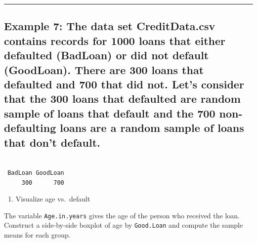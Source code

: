 \documentclass[
]{book}
\newenvironment{Shaded}{\begin{snugshade}}{\end{snugshade}}
\newcommand{\FunctionTok}[1]{\textcolor[rgb]{0.00,0.00,0.00}{#1}}
\newcommand{\NormalTok}[1]{#1}
\newcommand{\OtherTok}[1]{\textcolor[rgb]{0.56,0.35,0.01}{#1}}
\newcommand{\SpecialCharTok}[1]{\textcolor[rgb]{0.00,0.00,0.00}{#1}}
\newcommand{\StringTok}[1]{\textcolor[rgb]{0.31,0.60,0.02}{#1}}
\providecommand{\tightlist}{%
  \setlength{\itemsep}{0pt}\setlength{\parskip}{0pt}}
\begin{document}
\begin{center}\rule{0.5\linewidth}{0.5pt}\end{center}

\hypertarget{example-7-the-data-set-creditdata.csv-contains-records-for-1000-loans-that-either-defaulted-badloan-or-did-not-default-goodloan.-there-are-300-loans-that-defaulted-and-700-that-did-not.-lets-consider-that-the-300-loans-that-defaulted-are-random-sample-of-loans-that-default-and-the-700-non-defaulting-loans-are-a-random-sample-of-loans-that-dont-default.}{%
\subsection{Example 7: The data set CreditData.csv contains records for 1000 loans that either defaulted (BadLoan) or did not default (GoodLoan). There are 300 loans that defaulted and 700 that did not. Let's consider that the 300 loans that defaulted are random sample of loans that default and the 700 non-defaulting loans are a random sample of loans that don't default.}\label{example-7-the-data-set-creditdata.csv-contains-records-for-1000-loans-that-either-defaulted-badloan-or-did-not-default-goodloan.-there-are-300-loans-that-defaulted-and-700-that-did-not.-lets-consider-that-the-300-loans-that-defaulted-are-random-sample-of-loans-that-default-and-the-700-non-defaulting-loans-are-a-random-sample-of-loans-that-dont-default.}}

\begin{Shaded}
\end{Shaded}

\begin{verbatim}

 BadLoan GoodLoan 
     300      700 
\end{verbatim}

\begin{enumerate}
\def\labelenumi{(\alph{enumi})}
\tightlist
\item
  Visualize age vs.~default
\end{enumerate}

The variable \texttt{Age.in.years} gives the age of the person who received the loan. Construct a side-by-side boxplot of age by \texttt{Good.Loan} and compute the sample means for each group.
\end{document}
